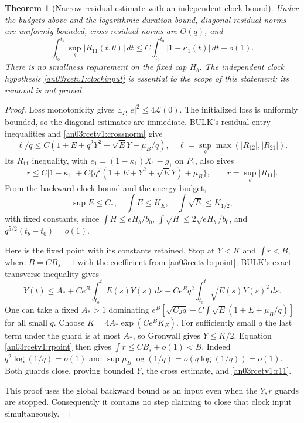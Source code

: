 \documentclass[11pt]{article}
\newtheorem{theorem}{Theorem}[section]
\newcommand{\E}{\mathbb E}
\newcommand{\dd}{\,d}
\begin{document}
\begin{theorem}[Narrow residual estimate with an independent clock bound]
\label{an03rcetv1:closure}
Under the budgets above and the logarithmic duration bound,
diagonal residual norms are uniformly bounded, cross residual norms
are $O(q)$, and
\begin{equation}\label{an03rcetv1:r11}
 \int_{t_0}^{t_b}\sup_\theta|R_{11}(t,\theta)|\dd t
 \le C\int_{t_0}^{t_b}|1-\kappa_1(t)|\dd t+o(1).
\end{equation}
There is no smallness requirement on the fixed cap $H_b$.
The independent clock hypothesis \eqref{an03rcetv1:clockinput}
is essential to the scope of this statement; its removal is not proved.
\end{theorem}
\begin{proof}
Loss monotonicity gives $\E_{P_i}|e|^2\le4\mathcal L(0)$.
The initialized loss is uniformly bounded, so the diagonal estimates
are immediate. BULK's residual-entry inequalities and
\eqref{an03rcetv1:crossnorm} give
\[
 \ell/q\le C(1+E+q^2Y^2+\sqrt E Y+\mu_B/q),
 \quad \ell=\sup_\theta\max(|R_{12}|,|R_{21}|).
\]
Its $R_{11}$ inequality, with $e_1=(1-\kappa_1)X_1-g_1$ on $P_1$,
also gives
\begin{equation}\label{an03rcetv1:rpoint}
 r\le C|1-\kappa_1|+
 C\{q^2(1+E+Y^2+\sqrt E Y)+\mu_B\},\qquad
 r=\sup_\theta|R_{11}|.
\end{equation}
From the backward clock bound and the energy budget,
\[
 \sup E\le C_*,\quad \int E\le K_E,\quad
 \int\sqrt E\le K_{1/2},
\]
with fixed constants, since
$\int H\le eH_b/b_0$, $\int\sqrt H\le2\sqrt{eH_b}/b_0$,
and $q^{5/2}(t_b-t_0)=o(1)$.

Here is the fixed point with its constants retained. Stop at $Y<K$
and $\int r<B$, where $B=CB_s+1$ with the coefficient from
\eqref{an03rcetv1:rpoint}. BULK's exact transverse inequality gives
\begin{equation}\label{an03rcetv1:volterra}
 Y(t)\le A_*+C e^B\int_{t_0}^t E(s)Y(s)\dd s
       +C e^Bq^2\int_{t_0}^t\sqrt{E(s)}Y(s)^2\dd s.
\end{equation}
One can take a fixed $A_*>1$ dominating
$e^B[\sqrt{C_Jq}+C\int\sqrt E(1+E+\mu_B/q)]$ for all small $q$.
Choose $K=4A_*\exp(Ce^BK_E)$. For sufficiently small $q$ the last
term under the guard is at most $A_*$, so Gronwall gives $Y\le K/2$.
Equation \eqref{an03rcetv1:rpoint} then gives $\int r\le CB_s+o(1)<B$.
Indeed $q^2\log(1/q)=o(1)$ and
$\sup\mu_B\log(1/q)=o(q\log(1/q))=o(1)$.
Both guards close, proving bounded $Y$, the cross estimate, and
\eqref{an03rcetv1:r11}.

This proof uses the global backward bound as an input even when
the $Y,r$ guards are stopped. Consequently it contains no step
claiming to close that clock input simultaneously.
\end{proof}
\end{document}
